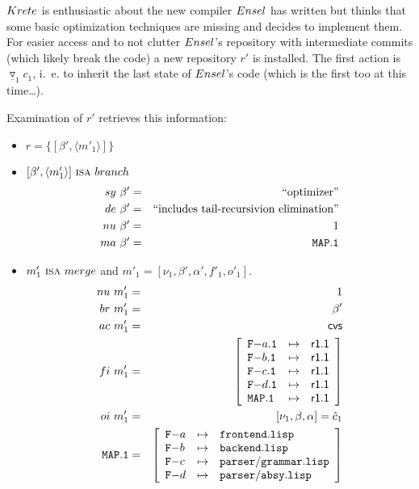 \documentclass[fleqn, 10pt, a4paper]{article}
\begin{document}
$\mathnormal{Krete}$ is enthusiastic about the new compiler
$\mathnormal{Ensel}$ has written but thinks that some basic
optimization techniques are missing and decides to implement
them. For easier access and to not clutter $\mathnormal{Ensel}$'s
repository with intermediate commits (which likely break the code)
a new repository $r'$ is installed. The first action is
$\underline{\triangledown}_1 c_1$, i.~e. to inherit the last
state of $\mathnormal{Ensel}$'s code (which is the first too at
this time\ldots).

Examination of $r'$ retrieves this information:

\begin{itemize}
\item $r=\{[\beta', \langle m'_1\rangle]\}$
\item $[\beta',\langle m'_1\rangle]\ \mbox{\textsc{isa}}\ \mathnormal{branch}$
\begin{eqnarray*}
\mathnormal{sy}\ \beta' &=& \mbox{``optimizer''} \\
\mathnormal{de}\ \beta' &=& \mbox{``includes tail-recursivion elimination''} \\
\mathnormal{nu}\ \beta' &=& 1 \\
\mathnormal{ma}\ \beta' &=& \mathtt{MAP.1}
\end{eqnarray*}

\item $m'_1\ \mbox{\textsc{isa}}\ \mathnormal{merge}$ and
$m'_1=[\nu_1, \beta', \alpha', f'_1, o'_1]$.
\begin{eqnarray*}
\mathnormal{nu}\ m'_1 &=& 1 \\
\mathnormal{br}\ m'_1 &=& \beta' \\
\mathnormal{ac}\ m'_1 &=& \mathsf{cvs} \\
\mathnormal{fi}\ m'_1 &=& \left[
\begin{array}{lcl}
\mathtt{F-}a\mathtt{.1} & \mapsto & \mathsf{r1.1} \\
\mathtt{F-}b\mathtt{.1} & \mapsto & \mathsf{r1.1} \\
\mathtt{F-}c\mathtt{.1} & \mapsto & \mathsf{r1.1} \\
\mathtt{F-}d\mathtt{.1} & \mapsto & \mathsf{r1.1} \\
\mathtt{MAP.1}         & \mapsto & \mathsf{r1.1} \\
\end{array}\right] \\
\mathnormal{oi}\ m'_1 &=& [\nu_1, \beta, \alpha] = \hat c_1 \\
\mathtt{MAP.1} &=& \left[
\begin{array}{lcl}
\mathtt{F-}a &\mapsto& \mathtt{frontend.lisp} \\
\mathtt{F-}b &\mapsto& \mathtt{backend.lisp} \\
\mathtt{F-}c &\mapsto& \mathtt{parser/grammar.lisp} \\
\mathtt{F-}d &\mapsto& \mathtt{parser/absy.lisp} \\
\end{array}\right]
\end{eqnarray*}
\end{itemize}
\end{document}
